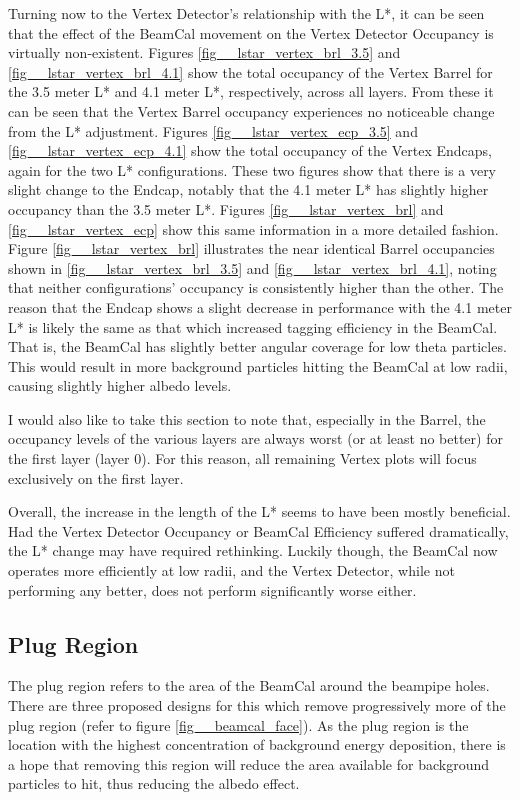 \documentclass{report}
\begin{document}
                Turning now to the Vertex Detector's relationship with the L*, it can be seen that the effect of the BeamCal movement on the Vertex Detector Occupancy is virtually non-existent. Figures \ref{fig__lstar_vertex_brl_3.5} and \ref{fig__lstar_vertex_brl_4.1} show the total occupancy of the Vertex Barrel for the 3.5 meter L* and 4.1 meter L*, respectively, across all layers. From these it can be seen that the Vertex Barrel occupancy experiences no noticeable change from the L* adjustment. Figures \ref{fig__lstar_vertex_ecp_3.5} and \ref{fig__lstar_vertex_ecp_4.1} show the total occupancy of the Vertex Endcaps, again for the two L* configurations. These two figures show that there is a very slight change to the Endcap, notably that the 4.1 meter L* has slightly higher occupancy than the 3.5 meter L*. Figures \ref{fig__lstar_vertex_brl} and \ref{fig__lstar_vertex_ecp} show this same information in a more detailed fashion. Figure \ref{fig__lstar_vertex_brl} illustrates the near identical Barrel occupancies shown in \ref{fig__lstar_vertex_brl_3.5} and \ref{fig__lstar_vertex_brl_4.1}, noting that neither configurations' occupancy is consistently higher than the other. The reason that the Endcap shows a slight decrease in performance with the 4.1 meter L* is likely the same as that which increased tagging efficiency in the BeamCal. That is, the BeamCal has slightly better angular coverage for low theta particles. This would result in more background particles hitting the BeamCal at low radii, causing slightly higher albedo levels.

                I would also like to take this section to note that, especially in the Barrel, the occupancy levels of the various layers are always worst (or at least no better) for the first layer (layer 0). For this reason, all remaining Vertex plots will focus exclusively on the first layer.

                Overall, the increase in the length of the L* seems to have been mostly beneficial. Had the Vertex Detector Occupancy or BeamCal Efficiency suffered dramatically, the L* change may have required rethinking. Luckily though, the BeamCal now operates more efficiently at low radii, and the Vertex Detector, while not performing any better, does not perform significantly worse either.


            \subsection{Plug Region}
                The plug region refers to the area of the BeamCal around the beampipe holes. There are three proposed designs for this which remove progressively more of the plug region (refer to figure \ref{fig__beamcal_face}). As the plug region is the location with the highest concentration of background energy deposition, there is a hope that removing this region will reduce the area available for background particles to hit, thus reducing the albedo effect.
\end{document}
